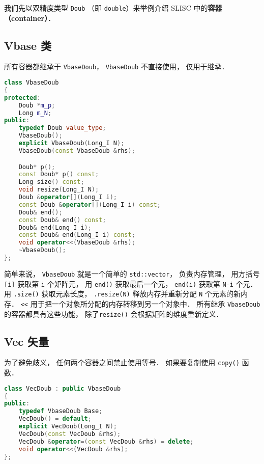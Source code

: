 
\begin{issues}
\issueDraft
\end{issues}


我们先以双精度类型 \verb|Doub| （即 \verb|double|）来举例介绍 SLISC 中的\textbf{容器（container）}．

\subsection{Vbase 类}
所有容器都继承于 \verb|VbaseDoub|， \verb|VbaseDoub| 不直接使用， 仅用于继承．
\begin{lstlisting}[language=cpp]
class VbaseDoub
{
protected:
    Doub *m_p;
    Long m_N;
public:
    typedef Doub value_type;
    VbaseDoub();
    explicit VbaseDoub(Long_I N);
    VbaseDoub(const VbaseDoub &rhs);

    Doub* p();
    const Doub* p() const;
    Long size() const;
    void resize(Long_I N);
    Doub &operator[](Long_I i);
    const Doub &operator[](Long_I i) const;
    Doub& end();
    const Doub& end() const;
    Doub& end(Long_I i);
    const Doub& end(Long_I i) const;
    void operator<<(VbaseDoub &rhs);
    ~VbaseDoub();
};
\end{lstlisting}

简单来说， \verb|VbaseDoub| 就是一个简单的 \verb|std::vector|， 负责内存管理， 用方括号 \verb|[i]| 获取第 \verb|i| 个矩阵元， 用 \verb|end()| 获取最后一个元， \verb|end(i)| 获取第 \verb|N-i| 个元． 用 \verb|.size()| 获取元素长度， \verb|.resize(N)| 释放内存并重新分配 \verb|N| 个元素的新内存． \verb|<<| 用于把一个对象所分配的内存转移到另一个对象中． 所有继承 \verb|VbaseDoub| 的容器都具有这些功能， 除了\verb|resize()| 会根据矩阵的维度重新定义．

\subsection{Vec 矢量}
为了避免歧义， 任何两个容器之间禁止使用等号． 如果要复制使用 \verb|copy()| 函数．
\begin{lstlisting}[language=cpp]
class VecDoub : public VbaseDoub
{
public:
    typedef VbaseDoub Base;
    VecDoub() = default;
    explicit VecDoub(Long_I N);
    VecDoub(const VecDoub &rhs);
    VecDoub &operator=(const VecDoub &rhs) = delete;
    void operator<<(VecDoub &rhs);
};
\end{lstlisting}


